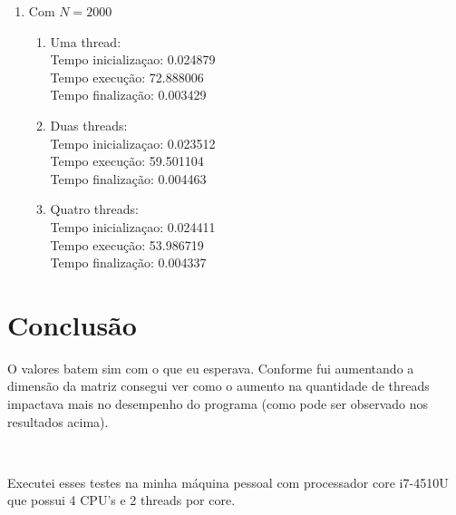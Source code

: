 \documentclass[11pt,oneside,openright,numbers=noenddot]{scrbook}
\begin{document}
\begin{enumerate}
\item Com $N = 2000$
	\begin{enumerate}
		\item Uma thread:\\
			Tempo inicializaçao: 0.024879\\
			Tempo execução: 72.888006\\
			Tempo finalização: 0.003429
		\item Duas threads:\\
			Tempo inicializaçao: 0.023512\\
			Tempo execução: 59.501104\\
			Tempo finalização: 0.004463
		\item Quatro threads:\\
			Tempo inicializaçao: 0.024411\\
			Tempo execução: 53.986719\\
			Tempo finalização: 0.004337
	\end{enumerate}
	
\end{enumerate}

\section{Conclusão}

O valores batem sim com o que eu esperava. Conforme fui aumentando a dimensão
da matriz consegui ver como o aumento na quantidade de threads
impactava mais no desempenho do programa (como pode ser observado nos resultados acima).

\


Executei esses testes na minha máquina pessoal com processador core i7-4510U 
que possui 4 CPU's e 2 threads por core.
\end{document}
